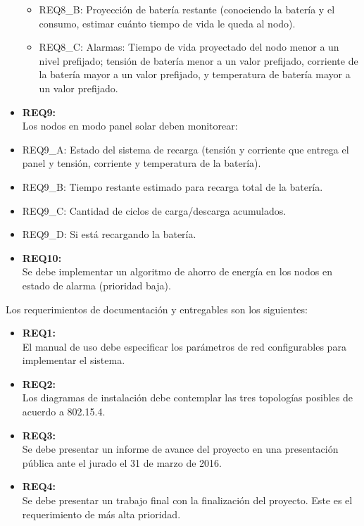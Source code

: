 \begin{itemize}
\begin{itemize}
		\item REQ8\_B: Proyección de batería restante (conociendo la batería y el consumo, estimar cuánto tiempo de vida le queda al nodo).
		\item REQ8\_C: Alarmas: Tiempo de vida proyectado del nodo menor a un nivel prefijado; tensión de batería menor a un valor prefijado, corriente de la batería mayor a un valor prefijado, y temperatura de batería mayor a un valor prefijado.
		\end{itemize}
	\item \textbf{REQ9:}\\Los nodos en modo panel solar deben monitorear:
		\item REQ9\_A: Estado del sistema de recarga (tensión y corriente que entrega el panel y tensión, corriente y temperatura de la batería).
		\item REQ9\_B: Tiempo restante estimado para recarga total de la batería.
		\item REQ9\_C: Cantidad de ciclos de carga/descarga acumulados.
		\item REQ9\_D: Si está recargando la batería.
	\item \textbf{REQ10:}\\Se debe implementar un algoritmo de ahorro de energía en los nodos en estado de alarma (prioridad baja).
\end{itemize}

\noindent Los requerimientos de documentación y entregables son los siguientes:
\begin{itemize}
	\item \textbf{REQ1:}\\ El manual de uso debe especificar los parámetros de red configurables para implementar el sistema.
	\item \textbf{REQ2:}\\ Los diagramas de instalación debe contemplar las tres topologías posibles de acuerdo a 802.15.4.
	\item \textbf{REQ3:}\\ Se debe presentar un informe de avance del proyecto en una presentación pública ante el jurado el 31 de marzo de 2016.
	\item \textbf{REQ4:}\\ Se debe presentar un trabajo final con la finalización del proyecto. Este es el requerimiento de más alta prioridad.	
\end{itemize}

\clearpage
